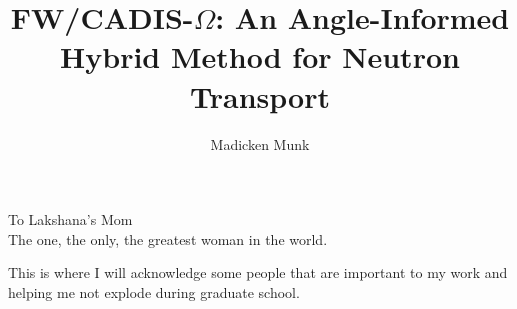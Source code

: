 \documentclass{ucbthesis}
\begin{document}

\title{FW/CADIS-$\Omega$: An Angle-Informed Hybrid Method for Neutron Transport}
\author{Madicken Munk}


\maketitle
\copyrightpage



\begin{frontmatter}

\begin{dedication}
\null\vfil
\begin{center}
To Lakshana's Mom\\\vspace{12pt}
The one, the only, the greatest woman in the world.
\end{center}
\vfil\null
\end{dedication}

\setcounter{secnumdepth}{3}
\setcounter{tocdepth}{3}

\tableofcontents
\clearpage
\listoffigures
\clearpage
\listoftables

\begin{acknowledgements}
This is where I will acknowledge some people that are important to
my work and helping me not explode during graduate school.
\end{acknowledgements}

\end{frontmatter}
\end{document}
